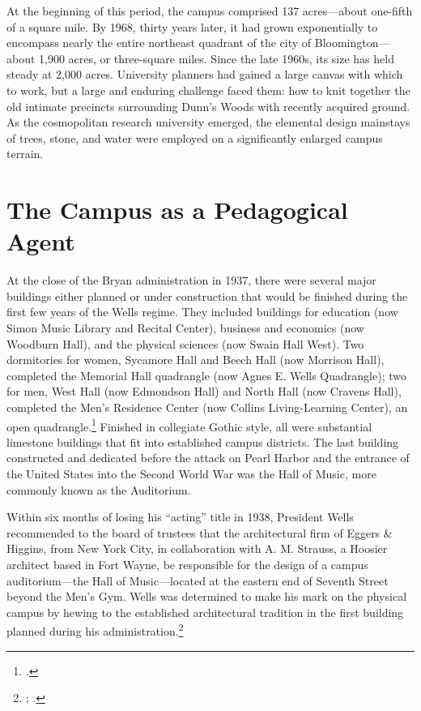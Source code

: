 \documentclass[
  american,
  letterpaper,
]{scrreprt}
\begin{document}
At the beginning of this period, the campus comprised 137 acres---about
one-fifth of a square mile. By 1968, thirty years later, it had grown
exponentially to encompass nearly the entire northeast quadrant of the
city of Bloomington---about 1,900 acres, or three-square miles. Since
the late 1960s, its size has held steady at 2,000 acres. University
planners had gained a large canvas with which to work, but a large and
enduring challenge faced them: how to knit together the old intimate
precincts surrounding Dunn's Woods with recently acquired ground. As the
cosmopolitan research university emerged, the elemental design mainstays
of trees, stone, and water were employed on a significantly enlarged
campus terrain.

\section{The Campus as a Pedagogical
Agent}\label{the-campus-as-a-pedagogical-agent}

At the close of the Bryan administration in 1937, there were several
major buildings either planned or under construction that would be
finished during the first few years of the Wells regime. They included
buildings for education (now Simon Music Library and Recital Center),
business and economics (now Woodburn Hall), and the physical sciences
(now Swain Hall West). Two dormitories for women, Sycamore Hall and
Beech Hall (now Morrison Hall), completed the Memorial Hall quadrangle
(now Agnes E. Wells Quadrangle); two for men, West Hall (now Edmondson
Hall) and North Hall (now Cravens Hall), completed the Men's Residence
Center (now Collins Living-Learning Center), an open
quadrangle.\footnote{.} Finished
in collegiate Gothic style, all were substantial limestone buildings
that fit into established campus districts. The last building
constructed and dedicated before the attack on Pearl Harbor and the
entrance of the United States into the Second World War was the Hall of
Music, more commonly known as the Auditorium.

Within six months of losing his ``acting'' title in 1938, President
Wells recommended to the board of trustees that the architectural firm
of Eggers \& Higgins, from New York City, in collaboration with A. M.
Strauss, a Hoosier architect based in Fort Wayne, be responsible for the
design of a campus auditorium---the Hall of Music---located at the
eastern end of Seventh Street beyond the Men's Gym. Wells was determined
to make his mark on the physical campus by hewing to the established
architectural tradition in the first building planned during his
administration.\footnote{; .}
\end{document}
